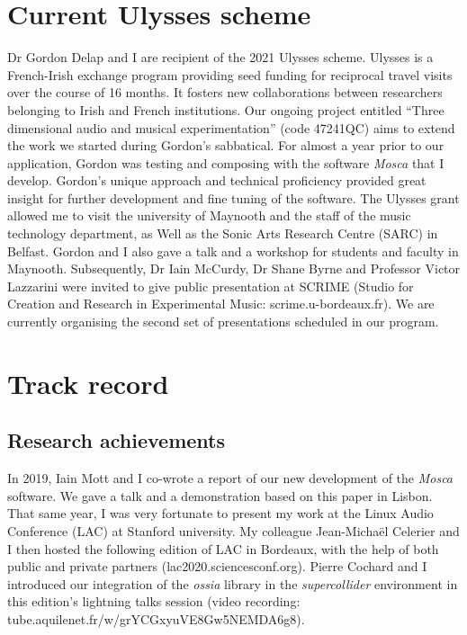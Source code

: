 \documentclass[journal,onecolumn]{IEEEtran}
\begin{document}
\section{Current Ulysses scheme} %
Dr Gordon Delap and I are recipient of the 2021 Ulysses scheme. Ulysses is a French-Irish exchange program providing seed funding for reciprocal travel visits over the course of 16 months. It fosters new collaborations between researchers belonging to Irish and French institutions. Our ongoing project entitled ``Three dimensional audio and musical experimentation'' (code 47241QC) aims to extend the work we started during Gordon's sabbatical. For almost a year prior to our application, Gordon was testing and composing with the software \textit{Mosca} \cite{mott:mosca} that I develop. Gordon's unique approach and technical proficiency provided great insight for further development and fine tuning of the software. The Ulysses grant allowed me to visit the university of Maynooth and the staff of the music technology department, as Well as the Sonic Arts Research Centre (SARC) in Belfast. Gordon and I also gave a talk and a workshop for students and faculty in Maynooth. Subsequently, Dr Iain McCurdy, Dr Shane Byrne and Professor Victor Lazzarini were invited to give public presentation at SCRIME (Studio for Creation and Research in Experimental Music: scrime.u-bordeaux.fr). We are currently organising the second set of presentations scheduled in our program.

\section{Track record}

\subsection{Research achievements} %
In 2019, Iain Mott and I co-wrote a report of our new development of the \textit{Mosca} software. We gave a talk and a demonstration based on this paper\cite{mott:mosca} in Lisbon. That same year, I was very fortunate to present my work \cite{keller:linux} at the Linux Audio Conference (LAC) at Stanford university. My colleague Jean-Michaël Celerier and I then hosted the following edition of LAC in Bordeaux, with the help of both public and private partners (lac2020.sciencesconf.org). Pierre Cochard and I introduced our integration of the \textit{ossia} library in the \textit{supercollider} environment in this edition's lightning talks session (video recording: tube.aquilenet.fr/w/grYCGxyuVE8Gw5NEMDA6g8). 
\end{document}
